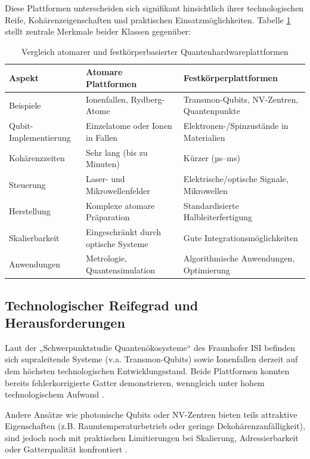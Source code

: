 Diese Plattformen unterscheiden sich signifikant hinsichtlich ihrer technologischen Reife, Kohärenzeigenschaften und praktischen Einsatzmöglichkeiten. Tabelle \ref{tab:plattformvergleich} stellt zentrale Merkmale beider Klassen gegenüber:

\begin{table}[h]
\centering
\caption{Vergleich atomarer und festkörperbasierter Quantenhardwareplattformen}
\label{tab:plattformvergleich}
\begin{tabular}{|p{4cm}|p{5cm}|p{5cm}|}
\hline
\textbf{Aspekt} & \textbf{Atomare Plattformen} & \textbf{Festkörperplattformen} \\
\hline
Beispiele & Ionenfallen, Rydberg-Atome & Transmon-Qubits, NV-Zentren, Quantenpunkte \\
Qubit-Implementierung & Einzelatome oder Ionen in Fallen & Elektronen-/Spinzustände in Materialien \\
Kohärenzzeiten & Sehr lang (bis zu Minuten) & Kürzer (µs–ms) \\
Steuerung & Laser- und Mikrowellenfelder & Elektrische/optische Signale, Mikrowellen \\
Herstellung & Komplexe atomare Präparation & Standardisierte Halbleiterfertigung \\
Skalierbarkeit & Eingeschränkt durch optische Systeme & Gute Integrationsmöglichkeiten \\
Anwendungen & Metrologie, Quantensimulation & Algorithmische Anwendungen, Optimierung \\
\hline
\end{tabular}
\end{table}


\subsection{Technologischer Reifegrad und Herausforderungen}
Laut der „Schwerpunktstudie Quantenökosysteme“ des Fraunhofer ISI befinden sich supraleitende Systeme (v.a. Transmon-Qubits) sowie Ionenfallen derzeit auf dem höchsten technologischen Entwicklungsstand. Beide Plattformen konnten bereits fehlerkorrigierte Gatter demonstrieren, wenngleich unter hohem technologischem Aufwand \cite{schmaltz2025}.

Andere Ansätze wie photonische Qubits oder NV-Zentren bieten teils attraktive Eigenschaften (z.B. Raumtemperaturbetrieb oder geringe Dekohärenzanfälligkeit), sind jedoch noch mit praktischen Limitierungen bei Skalierung, Adressierbarkeit oder Gatterqualität konfrontiert \cite{homeister2020}.

